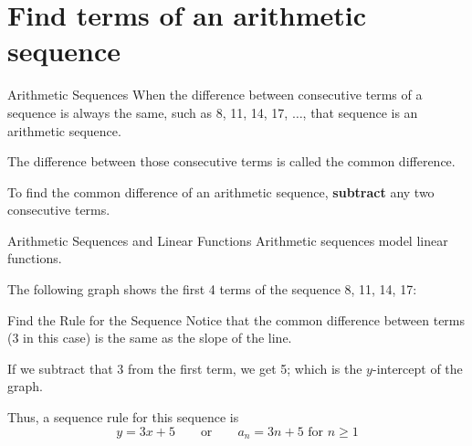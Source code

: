 \documentclass[t,usenames,dvipsnames]{beamer}
\begin{document}
\section{Find terms of an arithmetic sequence}

\begin{frame}{Arithmetic Sequences}
When the difference between consecutive terms of a sequence is always the same, such as 8, 11, 14, 17, $\dots$, that sequence is an \alert{arithmetic sequence}.   \newline\\ \pause

The difference between those consecutive terms is called the \alert{common difference}. \newline\\    \pause

To find the common difference of an arithmetic sequence, {\color{blue}\textbf{subtract}} any two consecutive terms.  
\end{frame}

\begin{frame}{Arithmetic Sequences and Linear Functions}
Arithmetic sequences model linear functions.    \newline\\  \pause

The following graph shows the first 4 terms of the sequence 8, 11, 14, 17:
\newline\\
\begin{center}
\end{center}
\end{frame}

\begin{frame}{Find the Rule for the Sequence}
Notice that the common difference between terms (3 in this case) is the same as the slope of the line.	\newline\\  \pause

If we subtract that 3 from the first term, we get 5; which is the $y$-intercept of the graph.	\newline\\  \pause

Thus, a sequence rule for this sequence is 
\[
y = 3x + 5 \qquad	\text{or}	\qquad	a_n = 3n+5 \text{ for } n \geq 1
\]
\end{frame}
\end{document}
